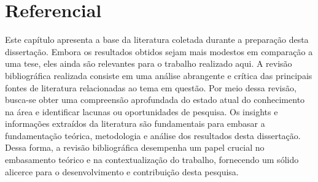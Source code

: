 \section{Referencial}\label{sec:refteo}


Este capítulo apresenta a base da literatura coletada durante a preparação desta dissertação. Embora os resultados obtidos sejam mais modestos em comparação a uma tese, eles ainda são relevantes para o trabalho realizado aqui. A revisão bibliográfica realizada consiste em uma análise abrangente e crítica das principais fontes de literatura relacionadas ao tema em questão. Por meio dessa revisão, busca-se obter uma compreensão aprofundada do estado atual do conhecimento na área e identificar lacunas ou oportunidades de pesquisa. Os insights e informações extraídos da literatura são fundamentais para embasar a fundamentação teórica, metodologia e análise dos resultados desta dissertação. Dessa forma, a revisão bibliográfica desempenha um papel crucial no embasamento teórico e na contextualização do trabalho, fornecendo um sólido alicerce para o desenvolvimento e contribuição desta pesquisa.





















